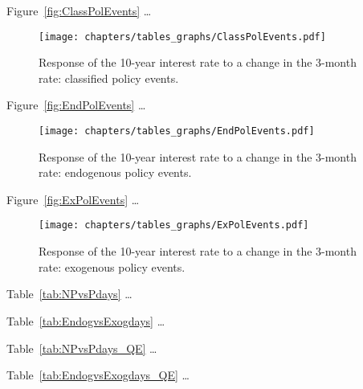 
Figure~\vref{fig:ClassPolEvents} \dots
\begin{figure}[htbp]
	\centering
		\texttt{[image: chapters/tables\_graphs/ClassPolEvents.pdf]} 
	\caption{Response of the 10-year interest rate to a change in the 3-month rate: classified policy events.}
\label{fig:ClassPolEvents}
\end{figure}
%

Figure~\vref{fig:EndPolEvents} \dots
\begin{figure}[htbp]
	\centering
	\texttt{[image: chapters/tables\_graphs/EndPolEvents.pdf]} 
	\caption{Response of the 10-year interest rate to a change in the 3-month rate: endogenous policy events.}
	\label{fig:EndPolEvents}
\end{figure}
%

Figure~\vref{fig:ExPolEvents} \dots
\begin{figure}[htbp]
	\centering
	\texttt{[image: chapters/tables\_graphs/ExPolEvents.pdf]} 
	\caption{Response of the 10-year interest rate to a change in the 3-month rate: exogenous policy events.}
	\label{fig:ExPolEvents}
\end{figure}
%

Table~\vref{tab:NPvsPdays} \dots 

%

Table~\vref{tab:EndogvsExogdays} \dots 

%


Table~\vref{tab:NPvsPdays_QE} \dots 

%

Table~\vref{tab:EndogvsExogdays_QE} \dots 

%
